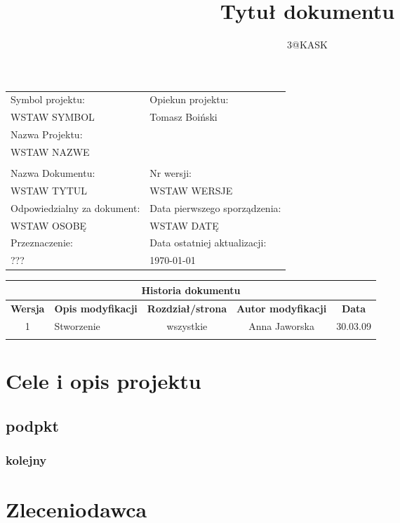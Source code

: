 \documentclass[a4paper,10pt]{article}
\title{Tytuł dokumentu}
\author{3@KASK}
\begin{document}



\maketitle


\begin{center}
\begin{tabular}{|p{7cm}|p{7cm}|}
\hline
Symbol projektu: & Opiekun projektu:   \tabularnewline 
WSTAW SYMBOL & Tomasz Boiński    \tabularnewline \hline
\multicolumn{2}{|l|}{Nazwa Projektu: } \tabularnewline
\multicolumn{2}{|l|}{WSTAW NAZWE } \tabularnewline 
\hline
\multicolumn{2}{l}{ } \tabularnewline %
\hline 
Nazwa Dokumentu: & Nr wersji:   \tabularnewline 
WSTAW TYTUL & WSTAW WERSJE \tabularnewline \hline
Odpowiedzialny za dokument: & Data pierwszego sporządzenia:   \tabularnewline 
WSTAW OSOBĘ & WSTAW DATĘ \tabularnewline \hline
Przeznaczenie: & Data ostatniej aktualizacji:   \tabularnewline 
??? & \today \tabularnewline \hline
\end{tabular}
\end{center}

\begin{center}
\begin{tabular}{|c|p{4cm}|c|c|c|}
\multicolumn{5}{c}{\textbf{Historia dokumentu}} \tabularnewline \hline
\textbf{Wersja} & \textbf{Opis modyfikacji} & \textbf{Rozdział/strona} & \textbf{Autor modyfikacji} & \textbf{Data} \tabularnewline \hline 
1 & Stworzenie & wszystkie & Anna Jaworska & 30.03.09 \tabularnewline \hline
& & & &\tabularnewline \hline
\end{tabular}
 

\end{center}


\newpage
\tableofcontents
\newpage

\section{Cele i opis projektu}
\subsection{podpkt}
\subsubsection{kolejny}
	
\section{Zleceniodawca}
\end{document}
